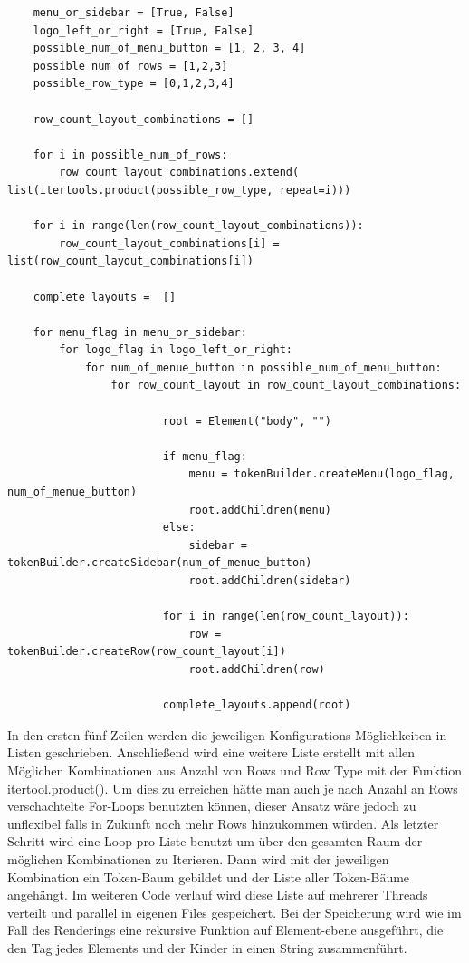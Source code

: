 \documentclass[pdftex,a4paper,halfparskip, article]{scrartcl}
\begin{document}
\begin{verbatim}
    menu_or_sidebar = [True, False]
    logo_left_or_right = [True, False]
    possible_num_of_menu_button = [1, 2, 3, 4]
    possible_num_of_rows = [1,2,3]
    possible_row_type = [0,1,2,3,4]

    row_count_layout_combinations = []

    for i in possible_num_of_rows:
        row_count_layout_combinations.extend( list(itertools.product(possible_row_type, repeat=i)))

    for i in range(len(row_count_layout_combinations)):
        row_count_layout_combinations[i] = list(row_count_layout_combinations[i])

    complete_layouts =  []

    for menu_flag in menu_or_sidebar:
        for logo_flag in logo_left_or_right:
            for num_of_menue_button in possible_num_of_menu_button:
                for row_count_layout in row_count_layout_combinations:

                        root = Element("body", "")

                        if menu_flag:
                            menu = tokenBuilder.createMenu(logo_flag, num_of_menue_button)
                            root.addChildren(menu)
                        else:
                            sidebar = tokenBuilder.createSidebar(num_of_menue_button)
                            root.addChildren(sidebar)

                        for i in range(len(row_count_layout)):
                            row = tokenBuilder.createRow(row_count_layout[i])
                            root.addChildren(row)

                        complete_layouts.append(root)
\end{verbatim}

In den ersten fünf Zeilen werden die jeweiligen Konfigurations Möglichkeiten in Listen geschrieben. Anschließend wird eine weitere Liste erstellt mit allen Möglichen Kombinationen aus Anzahl von Rows und Row Type mit der Funktion itertool.product(). Um dies zu erreichen hätte man auch je nach Anzahl an Rows verschachtelte For-Loops benutzten können, dieser Ansatz wäre jedoch zu unflexibel falls in Zukunft noch mehr Rows hinzukommen würden.
Als letzter Schritt wird eine Loop pro Liste benutzt um über den gesamten Raum der möglichen Kombinationen zu Iterieren. Dann wird mit der jeweiligen Kombination ein Token-Baum gebildet und der Liste aller Token-Bäume angehängt. Im weiteren Code verlauf wird diese Liste auf mehrerer Threads verteilt und parallel in eigenen Files gespeichert.
Bei der Speicherung wird wie im Fall des Renderings eine rekursive Funktion auf Element-ebene ausgeführt, die den Tag jedes Elements und der Kinder in einen String zusammenführt.
\end{document}

